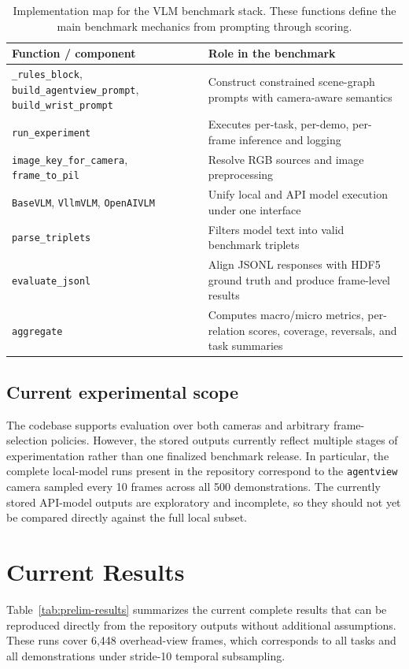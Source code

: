 \documentclass{article}
\begin{document}
\begin{table}[t]
    \caption{Implementation map for the VLM benchmark stack. These functions define the main benchmark mechanics from prompting through scoring.}
    \label{tab:impl-benchmark}
    \centering
    \begin{tabularx}{\linewidth}{lX}
        \toprule
        Function / component & Role in the benchmark \\
        \midrule
        \texttt{\_rules\_block}, \texttt{build\_agentview\_prompt}, \texttt{build\_wrist\_prompt} & Construct constrained scene-graph prompts with camera-aware semantics \\
        \texttt{run\_experiment} & Executes per-task, per-demo, per-frame inference and logging \\
        \texttt{image\_key\_for\_camera}, \texttt{frame\_to\_pil} & Resolve RGB sources and image preprocessing \\
        \texttt{BaseVLM}, \texttt{VllmVLM}, \texttt{OpenAIVLM} & Unify local and API model execution under one interface \\
        \texttt{parse\_triplets} & Filters model text into valid benchmark triplets \\
        \texttt{evaluate\_jsonl} & Align JSONL responses with HDF5 ground truth and produce frame-level results \\
        \texttt{aggregate} & Computes macro/micro metrics, per-relation scores, coverage, reversals, and task summaries \\
        \bottomrule
    \end{tabularx}
\end{table}

\subsection{Current experimental scope}
The codebase supports evaluation over both cameras and arbitrary frame-selection policies. However, the stored outputs currently reflect multiple stages of experimentation rather than one finalized benchmark release. In particular, the complete local-model runs present in the repository correspond to the \texttt{agentview} camera sampled every 10 frames across all 500 demonstrations. The currently stored API-model outputs are exploratory and incomplete, so they should not yet be compared directly against the full local subset.

\section{Current Results}
Table~\ref{tab:prelim-results} summarizes the current complete results that can be reproduced directly from the repository outputs without additional assumptions. These runs cover 6,448 overhead-view frames, which corresponds to all tasks and all demonstrations under stride-10 temporal subsampling.
\end{document}
